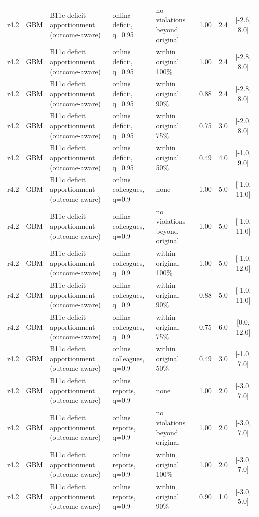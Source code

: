 \documentclass[10pt,onecolumn,letterpaper]{article}
\begin{document}
\begin{longtable}{lllp{4.2cm}p{3.4cm}ccc}
r4.2 & GBM & B11c deficit apportionment (outcome-aware) & online deficit, q=0.95 & no violations beyond original & 1.00 & 2.4 & [-2.6, 8.0] \\
r4.2 & GBM & B11c deficit apportionment (outcome-aware) & online deficit, q=0.95 & within original 100\% & 1.00 & 2.4 & [-2.8, 8.0] \\
r4.2 & GBM & B11c deficit apportionment (outcome-aware) & online deficit, q=0.95 & within original 90\% & 0.88 & 2.4 & [-2.8, 8.0] \\
r4.2 & GBM & B11c deficit apportionment (outcome-aware) & online deficit, q=0.95 & within original 75\% & 0.75 & 3.0 & [-2.0, 8.0] \\
r4.2 & GBM & B11c deficit apportionment (outcome-aware) & online deficit, q=0.95 & within original 50\% & 0.49 & 4.0 & [-1.0, 9.0] \\
r4.2 & GBM & B11c deficit apportionment (outcome-aware) & online colleagues, q=0.9 & none & 1.00 & 5.0 & [-1.0, 11.0] \\
r4.2 & GBM & B11c deficit apportionment (outcome-aware) & online colleagues, q=0.9 & no violations beyond original & 1.00 & 5.0 & [-1.0, 11.0] \\
r4.2 & GBM & B11c deficit apportionment (outcome-aware) & online colleagues, q=0.9 & within original 100\% & 1.00 & 5.0 & [-1.0, 12.0] \\
r4.2 & GBM & B11c deficit apportionment (outcome-aware) & online colleagues, q=0.9 & within original 90\% & 0.88 & 5.0 & [-1.0, 11.0] \\
r4.2 & GBM & B11c deficit apportionment (outcome-aware) & online colleagues, q=0.9 & within original 75\% & 0.75 & 6.0 & [0.0, 12.0] \\
r4.2 & GBM & B11c deficit apportionment (outcome-aware) & online colleagues, q=0.9 & within original 50\% & 0.49 & 3.0 & [-1.0, 7.0] \\
r4.2 & GBM & B11c deficit apportionment (outcome-aware) & online reports, q=0.9 & none & 1.00 & 2.0 & [-3.0, 7.0] \\
r4.2 & GBM & B11c deficit apportionment (outcome-aware) & online reports, q=0.9 & no violations beyond original & 1.00 & 2.0 & [-3.0, 7.0] \\
r4.2 & GBM & B11c deficit apportionment (outcome-aware) & online reports, q=0.9 & within original 100\% & 1.00 & 2.0 & [-3.0, 7.0] \\
r4.2 & GBM & B11c deficit apportionment (outcome-aware) & online reports, q=0.9 & within original 90\% & 0.90 & 1.0 & [-3.0, 5.0] \\

\end{longtable}
\end{document}
